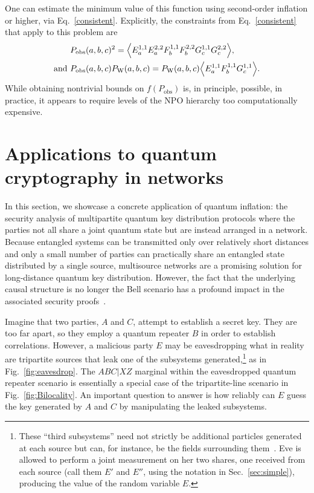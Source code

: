 \documentclass[superscriptaddress,aps,prx,nofootinbib,twocolumn,twoside,reprint,letterpaper,longbibliography]{revtex4-2}
\DeclarePairedDelimiter{\expec}{\langle}{\rangle}
\begin{document}
One can estimate the minimum value of this function using second-order inflation or higher, via Eq.~\eqref{consistent}. Explicitly, the constraints from Eq.~\eqref{consistent} that apply to this problem are
\begin{align*}
&P_\text{obs}(a,b,c)^2 = \expec*{E^{1,1}_aE^{2,2}_aF^{1,1}_bF^{2,2}_bG^{1,1}_cG^{2,2}_c},
\\\text{and }  &P_\text{obs}(a,b,c)P_\text{W}(a,b,c) = P_\text{W}(a,b,c)\expec*{E^{1,1}_aF^{1,1}_bG^{1,1}_c}.
\end{align*}
While obtaining nontrivial bounds on  $f(P_\text{obs})$ is, in principle, possible, in practice, it appears to require levels of the NPO hierarchy too computationally expensive.

\section{Applications to quantum cryptography in networks}\label{sec:cryptography}
In this section, we showcase a concrete application of quantum inflation: the security analysis of multipartite quantum key distribution protocols where the parties not all share a joint quantum state but are instead arranged in a network.
Because entangled systems can be transmitted only over relatively short distances and only a small number of parties can practically share an entangled state distributed by a single source, multisource networks are a promising solution for long-distance quantum key distribution.
However, the fact that the underlying causal structure is no longer the Bell scenario has a profound impact in the associated security proofs~\cite{lee2018crypto}.

Imagine that two parties, $A$ and $C$, attempt to establish a secret key.
They are too far apart, so they employ a quantum repeater $B$ in order to establish correlations.
However, a malicious party $E$ may be eavesdropping what in reality are tripartite sources that leak one of the subsystems generated,\footnote{These ``third subsystems'' need not strictly be additional particles generated at each source but can, for instance, be the fields surrounding them~\cite{thinh2016vacuumleakage}. Eve is allowed to perform a joint measurement on her two shares, one received from each source (call them $E'$ and $E''$, using the notation in Sec.~\ref{sec:simple}), producing the value of the random variable $E$.} as in Fig.~\ref{fig:eavesdrop}.
The $ABC|XZ$ marginal within the eavesdropped quantum repeater scenario is essentially a special case of the tripartite-line scenario in Fig.~\ref{fig:Bilocality}.
An important question to answer is how reliably can $E$ guess the key generated by $A$ and $C$ by manipulating the leaked subsystems.
\end{document}
